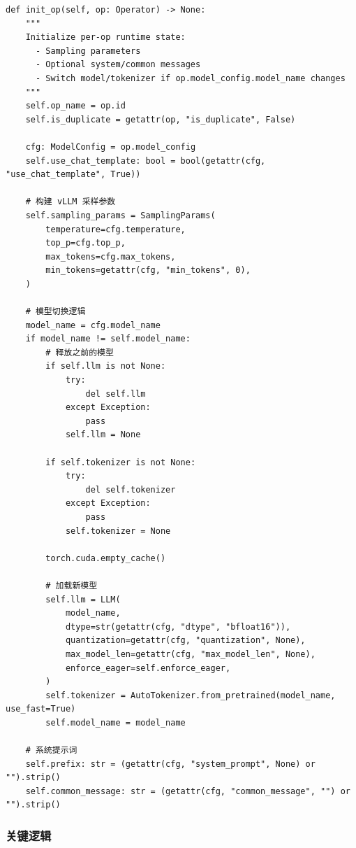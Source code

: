 \documentclass[12pt,a4paper]{article}
\begin{document}
\begin{lstlisting}
def init_op(self, op: Operator) -> None:
    """
    Initialize per-op runtime state:
      - Sampling parameters
      - Optional system/common messages
      - Switch model/tokenizer if op.model_config.model_name changes
    """
    self.op_name = op.id
    self.is_duplicate = getattr(op, "is_duplicate", False)
    
    cfg: ModelConfig = op.model_config
    self.use_chat_template: bool = bool(getattr(cfg, "use_chat_template", True))
    
    # 构建 vLLM 采样参数
    self.sampling_params = SamplingParams(
        temperature=cfg.temperature,
        top_p=cfg.top_p,
        max_tokens=cfg.max_tokens,
        min_tokens=getattr(cfg, "min_tokens", 0),
    )
    
    # 模型切换逻辑
    model_name = cfg.model_name
    if model_name != self.model_name:
        # 释放之前的模型
        if self.llm is not None:
            try:
                del self.llm
            except Exception:
                pass
            self.llm = None
        
        if self.tokenizer is not None:
            try:
                del self.tokenizer
            except Exception:
                pass
            self.tokenizer = None
        
        torch.cuda.empty_cache()
        
        # 加载新模型
        self.llm = LLM(
            model_name,
            dtype=str(getattr(cfg, "dtype", "bfloat16")),
            quantization=getattr(cfg, "quantization", None),
            max_model_len=getattr(cfg, "max_model_len", None),
            enforce_eager=self.enforce_eager,
        )
        self.tokenizer = AutoTokenizer.from_pretrained(model_name, use_fast=True)
        self.model_name = model_name
    
    # 系统提示词
    self.prefix: str = (getattr(cfg, "system_prompt", None) or "").strip()
    self.common_message: str = (getattr(cfg, "common_message", "") or "").strip()
\end{lstlisting}

\subsubsection{关键逻辑}
\end{document}
